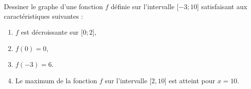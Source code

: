 
\begin{exercice}\label{exosmath-0518}

    Dessiner le graphe d'une fonction \( f\) définie sur l'intervalle \( \mathopen[ -3 ;10 \mathclose]\)  satisfaisant aux caractéristiques suivantes :
    \begin{enumerate}
        \item
            \( f\) est décroissante sur \( \mathopen[ 0; 2 \mathclose]\),
        \item
            \( f(0)=0\),
        \item
            \( f(-3)=6\).
        \item
            Le maximum de la fonction \( f\) sur l'intervalle \( \mathopen[ 2 , 10 \mathclose]\) est atteint pour \( x=10\).
    \end{enumerate}
    

\end{exercice}
